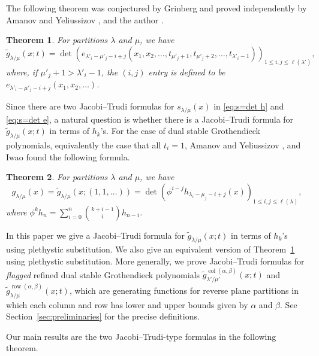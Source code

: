 \documentclass[12pt]{amsart}
\numberwithin{equation}{section}
\newtheorem{thm}{Theorem}[section]
\theoremstyle{definition}
\newcommand\wg{\widetilde{g}}
\newcommand\col{\operatorname{col}}
\newcommand\row{\operatorname{row}}
\newcommand\lm{{\lambda/\mu}}
\begin{document}
The following theorem was conjectured by Grinberg \cite{Grinberg_conj} and
proved independently by Amanov and Yeliussizov \cite{AmanovYeliussizov}, and the
author \cite{Kim:JT}.


\begin{thm}\label{thm:JT}\cite{AmanovYeliussizov, Kim:JT}
For partitions $\lambda$ and $\mu$, we have
\[
  \widetilde{g}_{\lambda/\mu}(x;t) = \det
  \left( e_{\lambda'_i-\mu'_j-i+j}
    (x_1,x_2,\dots,t_{\mu'_j+1},t_{\mu'_j+2},\dots,t_{\lambda'_i-1})
  \right)_{1\le i,j\le \ell(\lambda')},
\]
where, if $\mu'_j+1>\lambda'_i-1$, the $(i,j)$ entry is defined to be
$e_{\lambda'_i-\mu'_j-i+j} (x_1,x_2,\dots)$.
\end{thm}

Since there are two Jacobi--Trudi formulas for $s_{\lm}(x)$ in \eqref{eq:s=det
  h} and \eqref{eq:s=det e}, a natural question is whether there is a
Jacobi--Trudi formula for $\wg_\lm(x;t)$ in terms of $h_k$'s. For the case of
dual stable Grothendieck polynomials, equivalently the case that all $t_i=1$,
Amanov and Yeliussizov \cite[Theorem~14]{AmanovYeliussizov}, and Iwao
\cite[Proposition~5.2]{iwao20:free_groth} found the following formula.


\begin{thm}\label{thm:JT2}
\cite{AmanovYeliussizov, iwao20:free_groth}
For partitions $\lambda$ and $\mu$, we have
\[
  g_\lm(x)=\widetilde{g}_{\lambda/\mu}(x;(1,1,\dots)) = \det
  \left( \phi^{i-j} h_{\lambda_i-\mu_j-i+j} (x)
  \right)_{1\le i,j\le \ell(\lambda)},
\]
where $\phi^k h_n = \sum_{i=0}^n \binom{k+i-1}{i} h_{n-i}$.
\end{thm}

In this paper we give a Jacobi--Trudi formula for $\wg_\lm(x;t)$ in terms of
$h_k$'s using plethystic substitution. We also give an equivalent version of
Theorem~\ref{thm:JT} using plethystic substitution. More generally, we prove
Jacobi--Trudi formulas for \emph{flagged} refined dual stable Grothendieck
polynomials $\wg_{\lambda'/\mu'}^{\col(\alpha,\beta)}(x;t)$ and
$\wg_{\lambda/\mu}^{\row(\alpha,\beta)}(x;t)$, which are generating functions
for reverse plane partitions in which each column and row has lower and upper
bounds given by $\alpha$ and $\beta$. See Section~\ref{sec:preliminaries} for
the precise definitions.

Our main results are the two Jacobi--Trudi-type formulas in the following
theorem.
\end{document}
